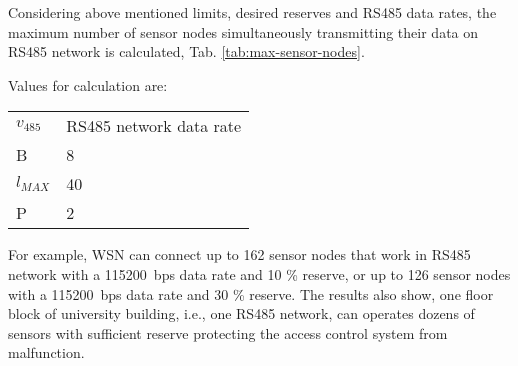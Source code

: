 Considering above mentioned limits, desired reserves and RS485 data rates, the maximum number of sensor nodes simultaneously transmitting their data on RS485 network is calculated, Tab. \ref{tab:max-sensor-nodes}.

Values for calculation are:

\begin{tabular}{l @{ $=$ } l}
$v_{485}$ & RS485 network data rate \\
 B        & 8 \\
$l_{MAX}$ & 40 \\
 P        & 2 \\
\end{tabular}


For example, WSN can connect up to 162 sensor nodes that work in RS485 network with a 115200~bps data rate and 10 \% reserve, or up to 126 sensor nodes with a 115200~bps data rate and 30 \% reserve. The results also show, one floor block of university building, i.e., one RS485 network, can operates dozens of sensors with sufficient reserve protecting the access control system from malfunction.   


